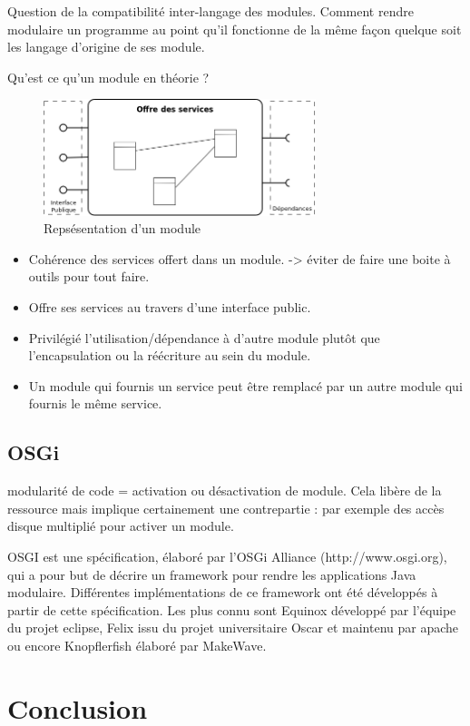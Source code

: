 \documentclass[a4paper, 11pt]{report}
\begin{document}
Question de la compatibilité inter-langage des modules. Comment rendre modulaire un programme au point qu’il fonctionne de la même façon quelque soit les langage d’origine de ses module.

Qu’est ce qu’un module en théorie ?
\begin{figure}
	\begin{center}
		\includegraphics[width=300px]{../../Figures/Bibliographie/modular}
		\caption{Repsésentation d'un module}
	\end{center}
\end{figure}

\begin{itemize}
	\item Cohérence des services offert dans un module. -> éviter de faire une boite à outils pour tout faire.
	\item Offre ses services au travers d’une interface public.
	\item Privilégié l’utilisation/dépendance à d’autre module plutôt que l’encapsulation ou la réécriture au sein du module.
	\item Un module qui fournis un service peut être remplacé par un autre module qui fournis le même service.
\end{itemize}
\subsection{OSGi}
modularité de code = activation ou désactivation de module. Cela libère de la ressource mais implique certainement une contrepartie : par exemple des accès disque multiplié pour activer un module.

OSGI est une spécification, élaboré par l’OSGi Alliance (http://www.osgi.org), qui a pour but de décrire un framework pour rendre les applications Java modulaire. Différentes implémentations de ce framework ont été développés à partir de cette spécification. Les plus connu sont Equinox développé par l’équipe du projet eclipse, Felix issu du projet universitaire Oscar et maintenu par apache ou encore Knopflerfish élaboré par MakeWave.
\section{Conclusion}
\end{document}
